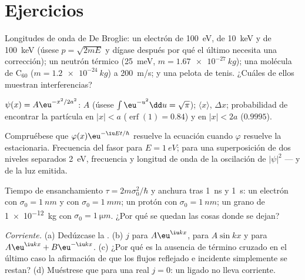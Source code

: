 \section{Ejercicios}

\begin{exercise}[$\star$]\label{exo:b2:schrodinger-wave-functions:1}
Longitudes de onda de De Broglie: un electrón de \qty{100}{eV}, de \qty{10}{keV} y de
\qty{100}{keV} (úsese $p = \sqrt{2mE}$ y dígase después por qué el último necesita una
corrección); un neutrón térmico (\qty{25}{meV}, $m = \qty{1.67e-27}{kg}$); una
molécula de C$_{60}$ ($m = \qty{1.2e-24}{kg}$) a \qty{200}{m/s}; y una pelota de
tenis. ¿Cuáles de ellos muestran interferencias?
\end{exercise}

\begin{exercise}[$\star$]\label{exo:b2:schrodinger-wave-functions:2}
$\psi(x) = A\eu^{-x^2/2a^2}$: $A$ (úsese $\int\eu^{-u^2}\dd u = \sqrt\pi$);
$\langle x\rangle$, $\Delta x$; probabilidad de encontrar la partícula en
$|x| < a$ ($\operatorname{erf}(1) = 0.84$) y en $|x| < 2a$ ($0.9995$).
\end{exercise}

\begin{exercise}[$\star$]\label{exo:b2:schrodinger-wave-functions:3}
Compruébese que $\varphi(x)\eu^{-\iu Et/\hbar}$ resuelve la ecuación cuando $\varphi$
resuelve la estacionaria. Frecuencia del fasor para $E = \qty{1}{eV}$;
para una superposición de dos niveles separados \qty{2}{eV}, frecuencia y
longitud de onda de la oscilación de $|\psi|^2$ --- y de la luz
emitida.
\end{exercise}

\begin{exercise}[$\star$]\label{exo:b2:schrodinger-wave-functions:4}
Tiempo de ensanchamiento $\tau = 2m\sigma_0^2/\hbar$ y anchura tras \qty{1}{ns} y
\qty{1}{s}: un electrón con $\sigma_0 = \qty{1}{nm}$ y con $\sigma_0 = \qty{1}{mm}$;
un protón con $\sigma_0 = \qty{1}{nm}$; un grano de \qty{1e-12}{kg} con
$\sigma_0 = \qty{1}{\micro m}$. ¿Por qué se quedan las cosas donde se dejan?
\end{exercise}

\begin{exercise}[$\star\star$]\label{exo:b2:schrodinger-wave-functions:5}
\emph{Corriente.} (a) Dedúzcase la . (b) $j$ para
$A\eu^{\iu kx}$, para $A\sin kx$ y para $A\eu^{\iu kx} + B\eu^{-\iu kx}$. (c) ¿Por qué es
la ausencia de término cruzado en el último caso la afirmación de que los flujos
reflejado e incidente simplemente se restan? (d) Muéstrese que para una  real $j = 0$: un  ligado no lleva corriente.
\end{exercise}


